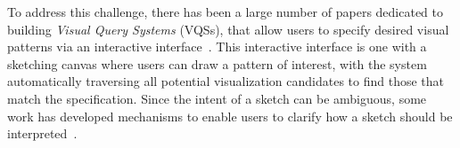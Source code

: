 \par To address this challenge,
there has been a large number of papers
dedicated to building {\em Visual Query Systems} (VQSs),
that allow users to specify
desired visual patterns
via an interactive interface~\cite{mohebbi2011google,Hochheiser2004,wattenberg2001sketching,Siddiqui2017VLDB,ryall2005querylines,correll2016semantics,Mannino2018,Eichmann2015,Holz2009}.
This interactive interface is one with
a sketching canvas
where users can draw a pattern of interest,
with the system automatically traversing
all potential visualization candidates
to find those that match the specification.
Since the intent of a sketch can be ambiguous,
some work has developed mechanisms to
enable users to clarify
how a sketch should be interpreted~\cite{ryall2005querylines,correll2016semantics,Mannino2018,Eichmann2015,Holz2009}.

